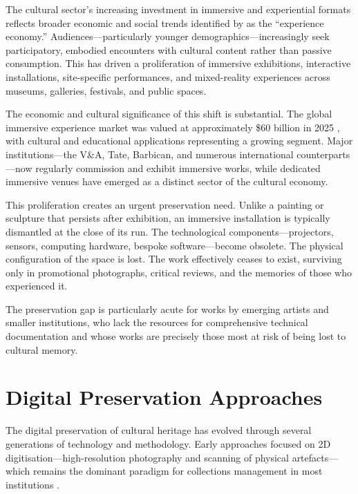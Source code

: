 The cultural sector's increasing investment in immersive and experiential formats reflects broader economic and social trends identified by \textcite{Pine1998} as the ``experience economy.'' Audiences---particularly younger demographics---increasingly seek participatory, embodied encounters with cultural content rather than passive consumption. This has driven a proliferation of immersive exhibitions, interactive installations, site-specific performances, and mixed-reality experiences across museums, galleries, festivals, and public spaces.

The economic and cultural significance of this shift is substantial. The global immersive experience market was valued at approximately \$60 billion in 2025 \parencite{GrandView2024}, with cultural and educational applications representing a growing segment. Major institutions---the V\&A, Tate, Barbican, and numerous international counterparts---now regularly commission and exhibit immersive works, while dedicated immersive venues have emerged as a distinct sector of the cultural economy.

This proliferation creates an urgent preservation need. Unlike a painting or sculpture that persists after exhibition, an immersive installation is typically dismantled at the close of its run. The technological components---projectors, sensors, computing hardware, bespoke software---become obsolete. The physical configuration of the space is lost. The work effectively ceases to exist, surviving only in promotional photographs, critical reviews, and the memories of those who experienced it.

The preservation gap is particularly acute for works by emerging artists and smaller institutions, who lack the resources for comprehensive technical documentation and whose works are precisely those most at risk of being lost to cultural memory.

\section{Digital Preservation Approaches}
\label{sec:bg-digital-preservation}

The digital preservation of cultural heritage has evolved through several generations of technology and methodology. Early approaches focused on 2D digitisation---high-resolution photography and scanning of physical artefacts---which remains the dominant paradigm for collections management in most institutions \parencite{FADGI2016}.

